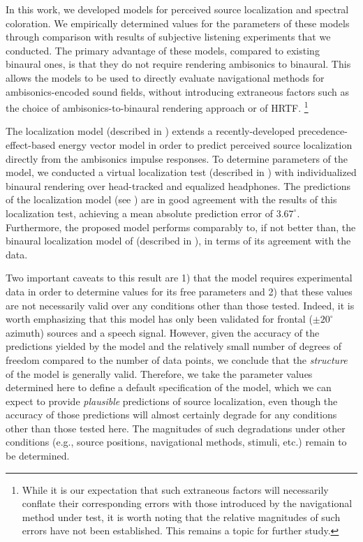 In this work, we developed models for perceived source localization and spectral coloration.
We empirically determined values for the parameters of these models through comparison with results of subjective listening experiments that we conducted.
The primary advantage of these models, compared to existing binaural ones, is that they do not require rendering ambisonics to binaural.
This allows the models to be used to directly evaluate navigational methods for ambisonics-encoded sound fields, without introducing extraneous factors such as the choice of ambisonics-to-binaural rendering approach or of HRTF.%
\footnote{While it is our expectation that such extraneous factors will necessarily conflate their corresponding errors with those introduced by the navigational method under test, it is worth noting that the relative magnitudes of such errors have not been established.
This remains a topic for further study.}

The localization model (described in ) extends a recently-developed precedence-effect-based energy vector model \citep{Stitt2016} in order to predict perceived source localization directly from the ambisonics impulse responses.
To determine parameters of the model, we conducted a virtual localization test (described in ) with individualized binaural rendering over head-tracked and equalized headphones.
The predictions of the localization model (see ) are in good agreement with the results of this localization test, achieving a mean absolute prediction error of $3.67^\circ$.
Furthermore, the proposed model performs comparably to, if not better than, the binaural localization model of \citet{Dietz2011} (described in ), in terms of its agreement with the data.

Two important caveats to this result are 1) that the model requires experimental data in order to determine values for its free parameters and 2) that these values are not necessarily valid over any conditions other than those tested.
Indeed, it is worth emphasizing that this model has only been validated for frontal ($\pm20^\circ$ azimuth) sources and a speech signal.
However, given the accuracy of the predictions yielded by the model and the relatively small number of degrees of freedom compared to the number of data points, we conclude that the \textit{structure} of the model is generally valid.
Therefore, we take the parameter values determined here to define a default specification of the model, which we can expect to provide \textit{plausible} predictions of source localization, even though the accuracy of those predictions will almost certainly degrade for any conditions other than those tested here.
The magnitudes of such degradations under other conditions (e.g., source positions, navigational methods, stimuli, etc.) remain to be determined.

